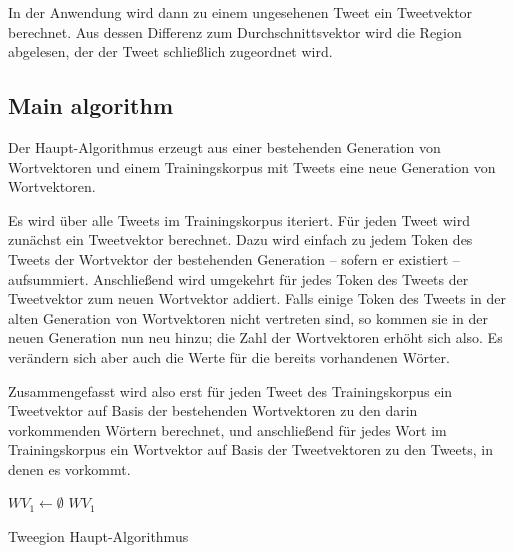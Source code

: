 \documentclass[../Main.tex]{subfiles}
\begin{document}
In der Anwendung wird dann zu einem ungesehenen Tweet ein Tweetvektor berechnet. Aus dessen Differenz zum Durchschnittsvektor wird die Region abgelesen, der der Tweet schließlich zugeordnet wird.

\subsection{Main algorithm}
Der Haupt-Algorithmus erzeugt aus einer bestehenden Generation von Wortvektoren und einem Trainingskorpus mit Tweets eine neue Generation von Wortvektoren.

Es wird über alle Tweets im Trainingskorpus iteriert. Für jeden Tweet wird zunächst ein Tweetvektor berechnet. Dazu wird einfach zu jedem Token des Tweets der Wortvektor der bestehenden Generation -- sofern er existiert -- aufsummiert. Anschließend wird umgekehrt für jedes Token des Tweets der Tweetvektor zum neuen Wortvektor addiert. Falls einige Token des Tweets in der alten Generation von Wortvektoren nicht vertreten sind, so kommen sie in der neuen Generation nun neu hinzu; die Zahl der Wortvektoren erhöht sich also. Es verändern sich aber auch die Werte für die bereits vorhandenen Wörter.

Zusammengefasst wird also erst für jeden Tweet des Trainingskorpus ein Tweetvektor auf Basis der bestehenden Wortvektoren zu den darin vorkommenden Wörtern berechnet, und anschließend für jedes Wort im Trainingskorpus ein Wortvektor auf Basis der Tweetvektoren zu den Tweets, in denen es vorkommt.\\

\begin{algorithm}[H]
 \SetAlgoLined\DontPrintSemicolon
 $WV_1 \gets\emptyset $\;
 \Return $WV_1$\;
 \caption{Tweegion Haupt-Algorithmus}
\end{algorithm}
\end{document}
